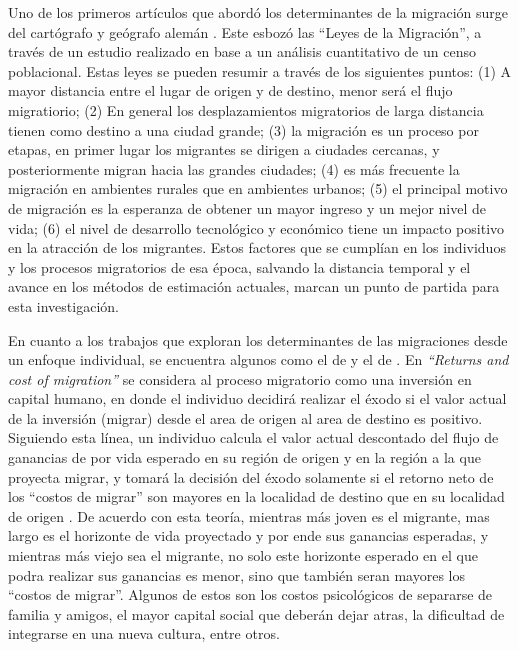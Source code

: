 \documentclass[12pt,a4paper]{article}
\begin{document}
Uno de los primeros artículos que abordó los determinantes de la migración surge del cartógrafo y geógrafo alemán \textcite{ravenstein_laws_1885}. Este esbozó las ``Leyes de la Migración'', a través de un estudio realizado en base a un análisis cuantitativo de un censo poblacional. Estas leyes se pueden resumir a través de los siguientes puntos: (1) A mayor distancia entre el lugar de origen y de destino, menor será el flujo migratiorio; (2) En general los desplazamientos migratorios de larga distancia tienen como destino a una ciudad grande; (3) la migración es un proceso por etapas, en primer lugar los migrantes se dirigen a ciudades cercanas, y posteriormente migran hacia las grandes ciudades; (4) es más frecuente la migración en ambientes rurales que en ambientes urbanos; (5) el principal motivo de migración es la esperanza de obtener un mayor ingreso y un mejor nivel de vida; (6) el nivel de desarrollo tecnológico y económico tiene un impacto positivo en la atracción de los migrantes. Estos factores que se cumplían en  los individuos y los procesos migratorios de esa época, salvando la distancia temporal y el avance en los métodos de estimación actuales, marcan un punto de partida para esta investigación.

En cuanto a los trabajos que exploran los determinantes de las migraciones desde un enfoque individual, se encuentra algunos como el de \textcite{sjaastad_costs_1962} y el de \textcite{todaro_model_1969}. En \textit{``Returns and cost of migration''}\parencite{sjaastad_costs_1962} se considera al proceso migratorio como una inversión en capital humano, en donde el individuo decidirá realizar el éxodo si el valor actual de la inversión (migrar) desde el area de origen al area de destino es positivo.  Siguiendo esta línea, un individuo calcula el valor actual descontado del flujo de ganancias de por vida esperado en su región de origen y en la región a la que proyecta migrar, y tomará la decisión del éxodo solamente si el retorno neto de los ``costos de migrar'' son mayores en la localidad de destino que en su localidad de origen \parencite{zaiceva_impact_2014}. De acuerdo con esta teoría, mientras más joven es el migrante, mas largo es el horizonte de vida proyectado y por ende sus ganancias esperadas, y mientras más viejo sea el migrante, no solo este horizonte esperado en el que podra realizar sus ganancias es menor, sino que también seran mayores  los ``costos de migrar''. Algunos de estos son los costos psicológicos de separarse de familia y amigos, el mayor capital social que deberán dejar atras, la dificultad de integrarse en una nueva cultura, entre otros.
\end{document}

